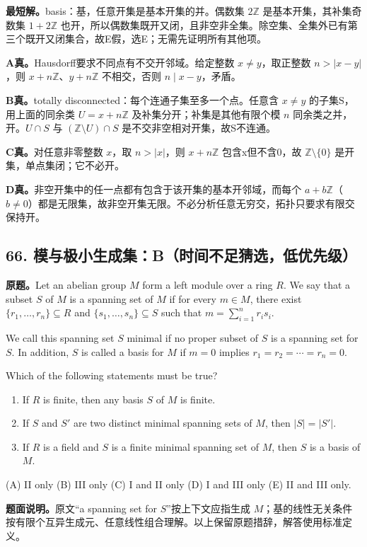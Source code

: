 \documentclass[11pt,a4paper,fontset=fandol]{ctexart}
\begin{document}
\textbf{最短解。}basis：基，任意开集是基本开集的并。偶数集 $2\mathbb Z$ 是基本开集，其补集奇数集 $1+2\mathbb Z$ 也开，所以偶数集既开又闭，且非空非全集。除空集、全集外已有第三个既开又闭集合，故E假，选E；无需先证明所有其他项。

\textbf{A真。}Hausdorff要求不同点有不交开邻域。给定整数 $x\ne y$，取正整数 $n>|x-y|$，则 $x+n\mathbb Z$、$y+n\mathbb Z$ 不相交，否则 $n\mid x-y$，矛盾。

\textbf{B真。}totally disconnected：每个连通子集至多一个点。任意含 $x\ne y$ 的子集S，用上面的同余类 $U=x+n\mathbb Z$ 及补集分开；补集是其他有限个模 $n$ 同余类之并，开。$U\cap S$ 与 $(\mathbb Z\setminus U)\cap S$ 是不交非空相对开集，故S不连通。

\textbf{C真。}对任意非零整数 $x$，取 $n>|x|$，则 $x+n\mathbb Z$ 包含x但不含0，故 $\mathbb Z\setminus\{0\}$ 是开集，单点集闭；它不必开。

\textbf{D真。}非空开集中的任一点都有包含于该开集的基本开邻域，而每个 $a+b\mathbb Z$（$b\ne0$）都是无限集，故非空开集无限。不必分析任意无穷交，拓扑只要求有限交保持开。

\subsection{66. 模与极小生成集：B（时间不足猜选，低优先级）}
\label{ms:q66}
\textbf{原题。}Let an abelian group $M$ form a left module over a ring $R$. We say that a subset $S$ of $M$ is a spanning set of $M$ if for every $m\in M$, there exist $\{r_1,\ldots,r_n\}\subseteq R$ and $\{s_1,\ldots,s_n\}\subseteq S$ such that $m=\sum_{i=1}^n r_is_i$.

We call this spanning set $S$ minimal if no proper subset of $S$ is a spanning set for $S$. In addition, $S$ is called a basis for $M$ if $m=0$ implies $r_1=r_2=\cdots=r_n=0$.

Which of the following statements must be true?
\begin{enumerate}[label=\Roman*.]
\item If $R$ is finite, then any basis $S$ of $M$ is finite.
\item If $S$ and $S'$ are two distinct minimal spanning sets of $M$, then $|S|=|S'|$.
\item If $R$ is a field and $S$ is a finite minimal spanning set of $M$, then $S$ is a basis of $M$.
\end{enumerate}
(A) II only \quad (B) III only \quad (C) I and II only \quad (D) I and III only \quad (E) II and III only.

\textbf{题面说明。}原文“a spanning set for $S$”按上下文应指生成 $M$；基的线性无关条件按有限个互异生成元、任意线性组合理解。以上保留原题措辞，解答使用标准定义。
\end{document}
